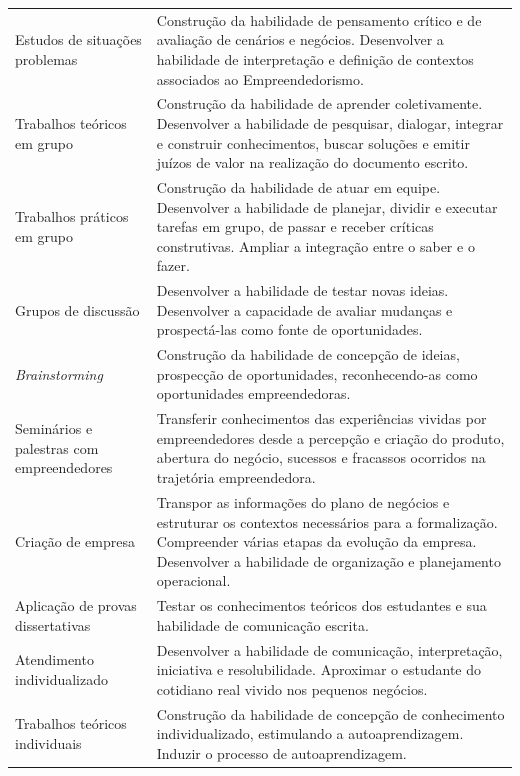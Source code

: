 \begin{center}
\begin{longtable}{p{3.5cm}p{11.0cm}}
Estudos de situações problemas & Construção da habilidade de pensamento crítico e de avaliação de cenários e
negócios. Desenvolver a habilidade de interpretação e definição de contextos associados ao Empreendedorismo. \\ 

Trabalhos teóricos em grupo & Construção da habilidade de aprender coletivamente. Desenvolver a
habilidade de pesquisar, dialogar, integrar e construir conhecimentos,
buscar soluções e emitir juízos de valor na realização do documento escrito. \\ 

Trabalhos práticos em grupo & Construção da habilidade de atuar em equipe. Desenvolver a habilidade de planejar, dividir e executar tarefas em grupo, de passar e receber críticas construtivas. Ampliar a integração entre o saber e o fazer.  \\ 

Grupos de discussão & Desenvolver a habilidade de testar novas ideias. Desenvolver a capacidade de avaliar mudanças e prospectá-las como fonte de oportunidades. \\ 
 
\textit{Brainstorming}  & Construção da habilidade de concepção de ideias, prospecção de
oportunidades, reconhecendo-as como oportunidades empreendedoras. \\ 


Seminários e palestras com empreendedores & Transferir conhecimentos das experiências vividas por empreendedores
desde a percepção e criação do produto, abertura do negócio, sucessos e
fracassos ocorridos na trajetória empreendedora. \\ 

Criação de empresa & Transpor as informações do plano de negócios e estruturar os contextos necessários para a formalização. Compreender várias etapas da evolução da empresa. Desenvolver a habilidade de organização e planejamento operacional. \\ 

Aplicação de provas dissertativas & Testar os conhecimentos teóricos dos estudantes e sua habilidade de
comunicação escrita. \\ 

Atendimento individualizado & Desenvolver a habilidade de comunicação, interpretação, iniciativa e
resolubilidade. Aproximar o estudante do cotidiano real vivido nos pequenos negócios. \\ 

Trabalhos teóricos individuais & Construção da habilidade de concepção de conhecimento individualizado,
estimulando a autoaprendizagem. Induzir o processo de autoaprendizagem. \\ 


\end{longtable}
\end{center}
